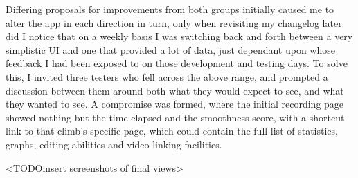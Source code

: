 Differing proposals for improvements from both groups initially caused me to alter the app in each direction in turn, only when revisiting my changelog later did I notice that on a weekly basis I was switching back and forth between a very simplistic  UI and one that provided a lot of data, just dependant upon whose feedback I had been exposed to on those development and testing days.
To solve this, I invited three testers who fell across the above range, and prompted a discussion between them around both what they would expect to see, and what they wanted to see.
A compromise was formed, where the initial recording page showed nothing but the time elapsed and the smoothness score, with a shortcut link to that climb's specific page, which could contain the full list of statistics, graphs, editing abilities and video-linking facilities.

<TODOinsert screenshots of final views>

